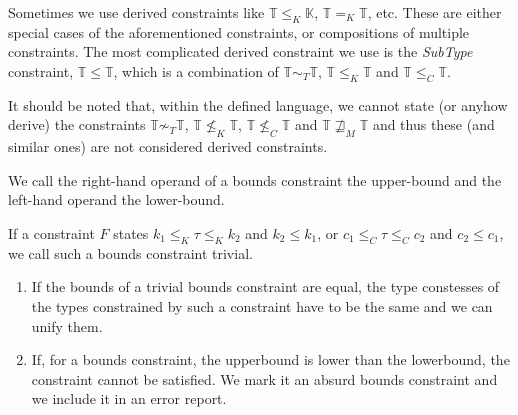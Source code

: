 \begin{remark}
    Sometimes we use derived constraints like $\mathbb{T} \leq_K \mathbb{K}$, $\mathbb{T} =_K \mathbb{T}$, etc. These are either special cases of the aforementioned constraints, or compositions of multiple constraints. The most complicated derived constraint we use is the \emph{SubType} constraint, $\mathbb{T} \leq \mathbb{T}$, which is a combination of $\mathbb{T} \sim_T \mathbb{T}$, $\mathbb{T} \leq_K \mathbb{T}$ and $\mathbb{T} \leq_C \mathbb{T}$.
\end{remark}

\begin{remark}
    It should be noted that, within the defined language, we cannot state (or anyhow derive) the constraints $\mathbb{T} \not\sim_T \mathbb{T}$, $\mathbb{T} \not\leq_K \mathbb{T}$, $\mathbb{T} \not\leq_C \mathbb{T}$ and $\mathbb{T} \not\sqsupseteq_M \mathbb{T}$ and thus these (and similar ones) are not considered derived constraints.
\end{remark}


\begin{defn}[Bounds]
    We call the right-hand operand of a bounds constraint the upper-bound and the left-hand operand the lower-bound.
\end{defn}

\begin{defn}
    If a constraint $F$ states $k_1 \leq_K \tau \leq_K k_2$ and $k_2 \leq k_1$, or $c_1 \leq_C \tau \leq_C c_2$ and $c_2 \leq c_1$, we call such a bounds constraint trivial.

\end{defn}

\begin{lemma}
    \label{trivBoundsObs}
    \begin{enumerate}
        \item If the bounds of a trivial bounds constraint are equal, the type constesses of the types constrained by such a constraint have to be the same and we can unify them.
        \item If, for a bounds constraint, the upperbound is lower than the lowerbound, the constraint cannot be satisfied. We mark it an absurd bounds constraint and we include it in an error report.
    \end{enumerate}
\end{lemma}

